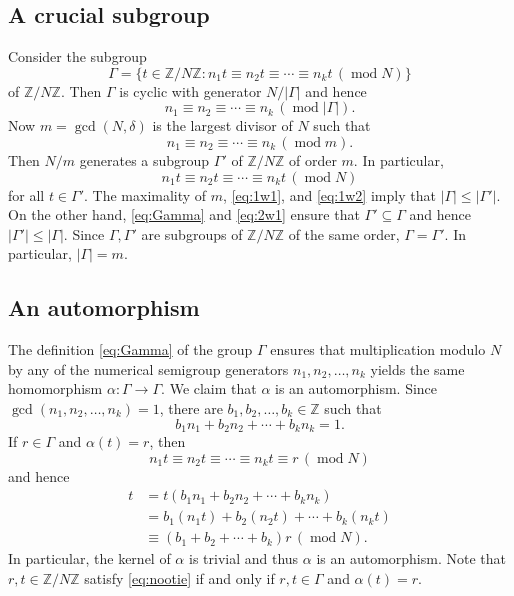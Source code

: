 \documentclass[10pt,reqno]{amsart}
\newcommand{\ZZ}{\mathbb{Z}}
\newcommand{\0}{\color{lightgray}0}
\renewcommand{\pmod}[1]{\,(\operatorname{mod} #1)}
\renewcommand\>{\rangle}
\newcommand\<{\langle}
\theoremstyle{plain}
\theoremstyle{definition}
\begin{document}
\subsection{A crucial subgroup}
Consider the subgroup
\begin{equation}\label{eq:Gamma}
\Gamma = \{ t \in \ZZ/N\ZZ : n_1 t \equiv n_2 t \equiv \cdots \equiv n_k t \pmod{N}\}
\end{equation}
of $\ZZ/N\ZZ$.  Then $\Gamma$ is cyclic with generator  
$N / |\Gamma|$ and hence
\begin{equation}\label{eq:1w1}
n_1 \equiv n_2 \equiv \cdots \equiv n_k \pmod{|\Gamma|}.
\end{equation}
Now $m = \gcd(N,\delta)$ is the largest divisor of $N$ such that
\begin{equation}\label{eq:1w2}
n_1 \equiv n_2 \equiv \cdots \equiv n_k \pmod{m}.
\end{equation}
Then $N/m$ generates a subgroup $\Gamma'$ of $\ZZ/N \ZZ$ of order $m$.
In particular,
\begin{equation}\label{eq:2w1}
n_1 t \equiv n_2 t \equiv \cdots \equiv n_k t \pmod{N}
\end{equation}
for all $t \in \Gamma'$.  
The maximality of $m$, \eqref{eq:1w1}, and \eqref{eq:1w2} imply that
$|\Gamma| \leq |\Gamma'|$.  
On the other hand, \eqref{eq:Gamma} and \eqref{eq:2w1}
ensure that $\Gamma' \subseteq \Gamma$ and hence $|\Gamma'| \leq |\Gamma|$.
Since $\Gamma, \Gamma'$ are subgroups of $\ZZ/N\ZZ$ of the same order,
$\Gamma = \Gamma'$.  In particular, $|\Gamma| = m$.

\subsection{An automorphism}
The definition \eqref{eq:Gamma} of the group $\Gamma$ ensures that 
multiplication modulo $N$ by any of the numerical semigroup generators $n_1,n_2,\ldots,n_k$ yields the same homomorphism $\alpha:\Gamma \to \Gamma$.
We claim that $\alpha$ is an automorphism.
Since $\gcd(n_1,n_2,\ldots,n_k) =1$, there are $b_1,b_2,\ldots,b_k \in \ZZ$ such that
\begin{equation*}
b_1 n_1 + b_2 n_2 + \cdots + b_k n_k = 1.
\end{equation*}
If $r \in \Gamma$ and $\alpha(t) = r$, then
\begin{equation}\label{eq:nootie}
n_1 t \equiv n_2 t \equiv \cdots \equiv n_k t \equiv r \pmod{N}
\end{equation}
and hence
\begin{align*}
t
&= t(b_1n_1+b_2n_2 + \cdots+b_kn_k) \\
&= b_1 (n_1 t) + b_2 (n_2 t) + \cdots + b_k (n_k t) \\
&\equiv (b_1 + b_2 + \cdots + b_k)r \pmod{N}.
\end{align*}
In particular, the kernel of $\alpha$ is trivial and thus $\alpha$ is an automorphism.
Note that $r,t \in \ZZ/N \ZZ$ satisfy \eqref{eq:nootie} if and only if $r,t \in \Gamma$ and $\alpha(t) = r$.
\end{document}

